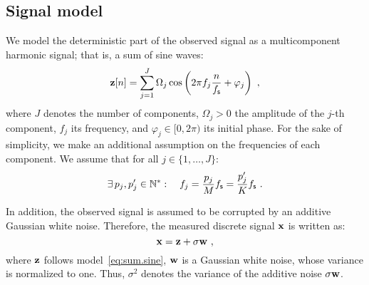 \subsection{Signal model}
We model the deterministic part of the observed signal as a multicomponent harmonic signal; that is, a sum of sine waves:
\begin{equation}
\bz[n]=\sum_{j=1}^J\Omega_j\cos\left(2\pi f_j \frac{n}{\fs} + \varphi_j\right)\ ,
\label{eq:sum.sine}
\end{equation}
where $J$ denotes the number of components, $\Omega_j>0$ the amplitude of the $j$-th component, $f_j$ its frequency, and $\varphi_j\in[0,2\pi)$ its initial phase.
%
For the sake of simplicity, we make an additional assumption on the frequencies of each component. We assume that for all $j\in\{1,\dots,J\}$:
\begin{equation}
\exists\, p_j,p_j'\in\mathbb N^*: \quad f_j = \dfrac{p_j}{M}f_{\mathsf s} = \dfrac{p'_j}{K}f_{\mathsf s}\ .
\end{equation}


In addition, the observed signal is assumed to be corrupted by an additive Gaussian white noise. Therefore, the measured discrete signal ${\mathbf x}$ is written as:
\begin{equation}
\bx = \bz + \sigma\bw\ ,
\label{eq:model.noise}
\end{equation}
where ${\mathbf z}$ follows model~\eqref{eq:sum.sine}, ${\mathbf w}$ is a Gaussian white noise, whose variance is normalized to one. Thus, $\sigma^2$ denotes the variance of the additive noise $\sigma{\mathbf w}$.

